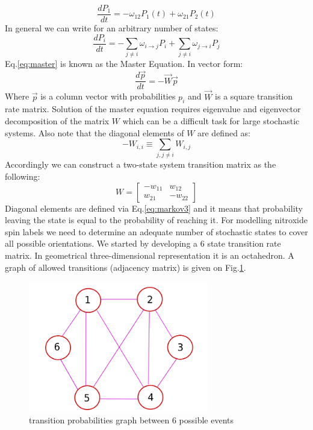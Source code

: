 \begin{equation}\label{eq:masterlol}
\frac{dP_{1}}{dt}=-\omega_{12}P_{1}(t)+\omega_{21}P_{2}(t)
\end{equation}
In general we can write for an arbitrary number of states: 
\begin{equation}\label{eq:master}
\frac{dP_{i}}{dt}=-\sum_{j\neq i}\omega_{i\rightarrow j}P_{i}+\sum_{j\neq i}\omega_{j\rightarrow i}P_{j}
\end{equation}
Eq.\ref{eq:master} is known as the Master Equation. In vector form:   
\begin{equation}\label{eq:matrix}
\frac{d\vec{p}}{dt}=-\vec{W}\vec{p}
\end{equation} 
Where $\vec{p}$ is a column vector with probabilities $p_i$ and $\vec{W}$ is a square transition rate matrix.
Solution of the master equation requires eigenvalue and eigenvector decomposition of the matrix $W$ which can be a difficult task for large stochastic systems. Also note that the diagonal elements of $W$ are defined as:  
\begin{equation}\label{eq:markov3}
-W_{i,i}\equiv\sum_{j,j\neq i}W_{i,j}
\end{equation} 
Accordingly we can construct a two-state system transition matrix as the following:   
\begin{equation}\label{eq:55}
W = \begin{bmatrix}
       -w_{11} & w_{12}  \\[0.3em]
        w_{21} & -w_{22}  
     \end{bmatrix}
\end{equation}
Diagonal elements are defined via Eq.\ref{eq:markov3} and it means that probability leaving the state is equal to the probability of reaching it.
For modelling nitroxide spin labels we need to determine an adequate number of stochastic states to cover all possible orientations. We started by developing a 6 state transition rate matrix. In geometrical three-dimensional representation it is an octahedron. A graph of allowed transitions (adjacency matrix) is given on Fig.\ref{figure:wdiagramm}.     
\begin{figure}[h!]
\begin{center}
\includegraphics[width=0.7\textwidth]{figures/chap2/wdiagramm.png}
\caption{transition probabilities graph between 6 possible events}
\label{figure:wdiagramm}
\end{center}
\end{figure}
